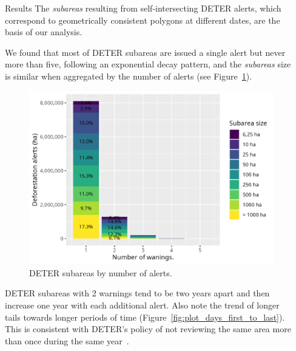 \documentclass[20pt]{beamer}
\begin{document}
\begin{frame}[fragile,t]
\begin{columns}[t]
\begin{column}{0.33\linewidth}
\end{column}




\begin{column}{0.33\linewidth}

\vspace{0.5cm}

    \begin{block}{Results\vphantom{g}}
        The \textit{subareas} resulting from self-intersecting DETER alerts, which correspond to geometrically consistent polygons at different dates, are the basis of our analysis.

        We found that most of DETER subareas are issued a single alert but never more than five, following an exponential decay pattern, and the \textit{subareas} size is similar when aggregated by the number of alerts (see Figure~\ref{fig:plot_area_by_warnings}).

\begin{figure}[h] 
    \begin{center}
    \includegraphics[width=\linewidth]{./figures/plot_area_by_warnings.png}
    \caption{DETER subareas by number of alerts. }
    \label{fig:plot_area_by_warnings}
    \end{center}
\end{figure}

        DETER subareas with 2 warnings tend to be two years apart and then increase one year with each additional alert.
        Also note the trend of longer tails towards longer periods of time (Figure~\ref{fig:plot_days_first_to_last}). 
        This is consistent with DETER's policy of not reviewing the same area more than once during the same year~\cite{dealmeida2022}.


\end{block}
\end{column}
\end{columns}
\end{frame}
\end{document}
